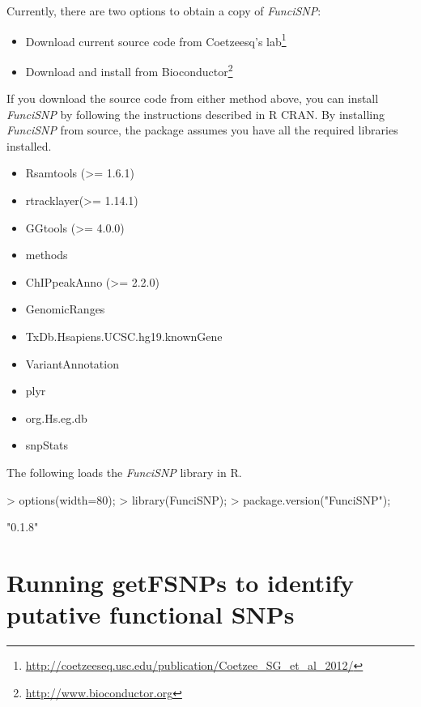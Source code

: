 \documentclass[12pt,fullpage]{article}
\newcommand{\Rpackage}[1]{{\textit{#1}}}
\begin{document}
Currently, there are two options to obtain a copy of \Rpackage{FunciSNP}: 

\begin{itemize}
\item Download current source code from Coetzeesq's
lab\footnote{\url{http://coetzeeseq.usc.edu/publication/Coetzee_SG_et_al_2012/}}
\item Download and install from
Bioconductor\footnote{\url{http://www.bioconductor.org}}
\end{itemize}

If you download the source code from either method above, you can install
\Rpackage{FunciSNP} by following the instructions described in R CRAN. By
installing \Rpackage{FunciSNP} from source, the package assumes you have all the
required libraries installed.

\begin{itemize}
\item Rsamtools (>= 1.6.1)
\item rtracklayer(>= 1.14.1)
\item GGtools (>= 4.0.0)
\item methods
\item ChIPpeakAnno (>= 2.2.0)
\item GenomicRanges
\item TxDb.Hsapiens.UCSC.hg19.knownGene
\item VariantAnnotation
\item plyr
\item org.Hs.eg.db
\item snpStats
\end{itemize}

The following loads the \Rpackage{FunciSNP} library in R.

\begin{Schunk}
\begin{Sinput}
> options(width=80);
> library(FunciSNP);
> package.version("FunciSNP");
\end{Sinput}
\begin{Soutput}
[1] "0.1.8"
\end{Soutput}
\end{Schunk}

\section{Running getFSNPs to identify putative functional SNPs}
\end{document}
